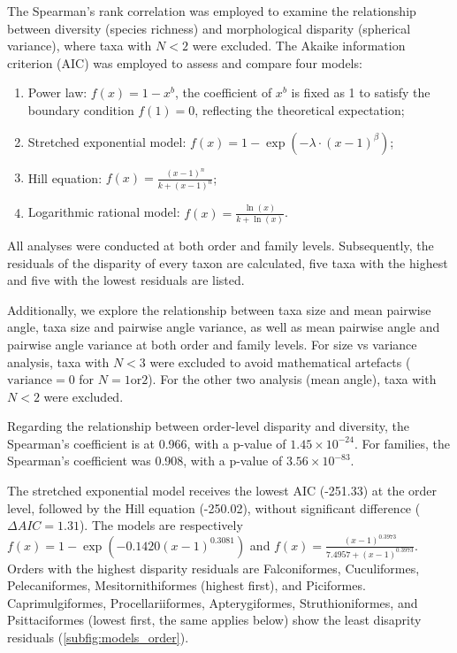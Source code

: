 The Spearman's rank correlation was employed to examine
the relationship between diversity (species richness) and morphological
disparity (spherical variance), where taxa with $N<2$ were excluded. The Akaike
information criterion (AIC) was employed to assess and compare four models:

\begin{enumerate}
    \item Power law: $f(x) = 1 - x^b$, the coefficient of $x^b$
        is fixed as 1 to satisfy the boundary condition $f(1) = 0$,
        reflecting the theoretical expectation;
    \item Stretched exponential model: $f(x) = 1 - \exp(-\lambda \cdot (x - 1)^\beta)$;
    \item Hill equation: $f(x) = \frac{(x - 1)^n}{k + (x - 1)^n}$;
    \item Logarithmic rational model: $f(x) = \frac{\ln(x)}{k + \ln(x)}$.
\end{enumerate}

All analyses were conducted at both order and family levels. Subsequently, the residuals
of the disparity of every taxon are calculated, five taxa with the highest and five with
the lowest residuals are listed.

Additionally, we explore the relationship between taxa size and mean pairwise angle,
taxa size and pairwise angle variance, as well as mean pairwise angle and pairwise
angle variance at both order and family levels. For size vs variance analysis,
taxa with $N<3$ were excluded to avoid mathematical artefacts
($\text{variance} = 0$ for $N=1 \text{or} 2$). For the other two analysis (mean angle),
taxa with $N<2$ were excluded.

Regarding the relationship between order-level disparity and diversity, the
Spearman's coefficient is at 0.966, with a p-value of $1.45\times10^{-24}$.
For families, the Spearman's coefficient was 0.908,
with a p-value of $3.56\times10^{-83}$.

The stretched exponential model receives the lowest AIC (-251.33) at the order
level, followed by the Hill equation (-250.02), without significant difference
($\Delta AIC = 1.31$). The models are respectively $f(x) = 1 - \exp(-0.1420(x - 1)^{0.3081})$
and $f(x) = \frac{(x - 1)^{0.3973}}{7.4957 + (x - 1)^{0.3973}}$.
Orders with the highest disparity residuals are Falconiformes, Cuculiformes,
Pelecaniformes, Mesitornithiformes (highest first), and Piciformes.
Caprimulgiformes, Procellariiformes, Apterygiformes, Struthioniformes, and Psittaciformes
(lowest first, the same applies below) show the least disaprity residuals (\cref{subfig:models_order}).


